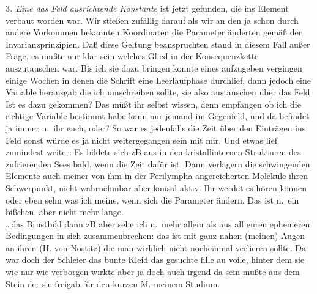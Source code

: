 \documentclass[
]{article}
\begin{document}
3\emph{. Eine das Feld ausrichtende Konstante} ist jetzt gefunden, die
ins Element verbaut worden war. Wir stießen zufällig darauf als wir an
den ja schon durch andere Vorkommen bekannten Koordinaten die Parameter
änderten gemäß der Invarianzprinzipien. Daß diese Geltung beanspruchten
stand in diesem Fall außer Frage, es mußte nur klar sein welches Glied
in der Konsequenzkette auszutauschen war. Bis ich sie dazu bringen
konnte eines aufzugeben vergingen einige Wochen in denen die Schrift
eine Leerlaufphase durchlief, dann jedoch eine Variable herausgab die
ich umschreiben sollte, sie also austauschen über das Feld. Ist es dazu
gekommen? Das müßt ihr selbst wissen, denn empfangen ob ich die richtige
Variable bestimmt habe kann nur jemand im Gegenfeld, und da befindet ja
immer n.~ihr euch, oder? So war es jedenfalls die Zeit über den
Einträgen ins Feld sonst würde es ja nicht weitergegangen sein mit mir.
Und etwas lief zumindest weiter: Es bildete sich zB aus in den
kristallinternen Strukturen des zufrierenden Sees bald, wenn die Zeit
dafür ist. Dann verlagern die schwingenden Elemente auch meiner von ihm
in der Perilympha angereicherten Moleküle ihren Schwerpunkt, nicht
wahrnehmbar aber kausal aktiv. Ihr werdet es hören können oder eben sehn
was ich meine, wenn sich die Parameter ändern. Das ist n.~ein bißchen,
aber nicht mehr lange.\\
\ldots das Brustbild dann zB aber sehe ich n.~mehr allein als aus all
euren ephemeren Bedingungen in sich zusammenbrechen: das ist mit ganz
nahen (meinen) Augen an ihren (H. von Nostitz) die man wirklich nicht
nocheinmal verlieren sollte. Da war doch der Schleier das bunte Kleid
das gesuchte fille au voile, hinter dem sie wie nur wie verborgen wirkte
aber ja doch auch irgend da sein mußte aus dem Stein der sie freigab für
den kurzen M. meinem Studium.
\end{document}
